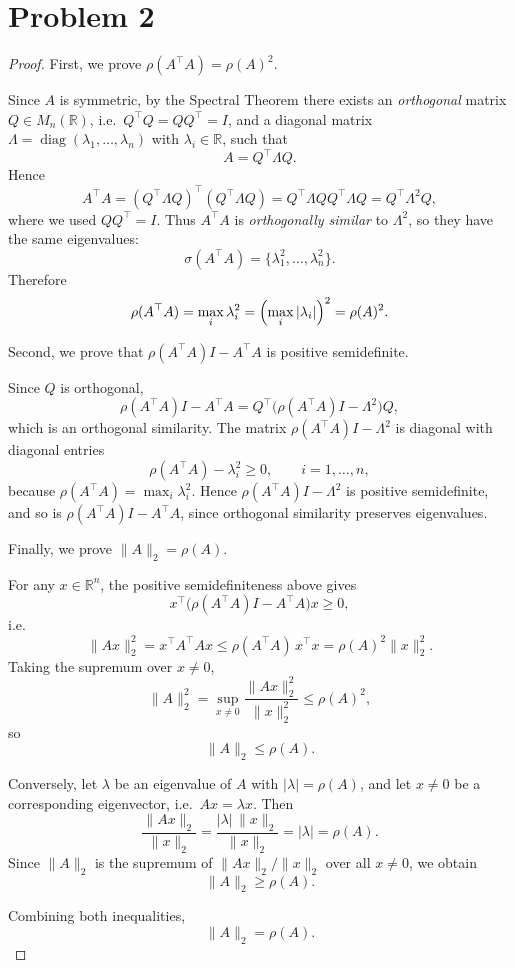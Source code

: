 \documentclass[11pt,a4paper]{report}
\theoremstyle{remark}
\begin{document}
\section*{Problem 2}
\begin{proof}
First, we prove \(\rho(A^\top A)=\rho(A)^2\).

Since \(A\) is symmetric, by the Spectral Theorem there exists an
\emph{orthogonal} matrix \(Q\in M_n(\mathbb{R})\), i.e.\ \(Q^\top Q=QQ^\top=I\),
and a diagonal matrix \(\Lambda=\operatorname{diag}(\lambda_1,\dots,\lambda_n)\)
with \(\lambda_i\in\mathbb{R}\), such that
\[
A=Q^\top \Lambda Q.
\]
Hence
\[
A^\top A
=(Q^\top \Lambda Q)^\top (Q^\top \Lambda Q)
=Q^\top \Lambda Q Q^\top \Lambda Q
=Q^\top \Lambda^2 Q,
\]
where we used \(QQ^\top=I\). Thus \(A^\top A\) is \emph{orthogonally similar}
to \(\Lambda^2\), so they have the same eigenvalues:
\[
\sigma(A^\top A)=\{\lambda_1^2,\dots,\lambda_n^2\}.
\]
Therefore
\[
\rho(A^\top A)
=\max_i \lambda_i^2
=\Bigl(\max_i |\lambda_i|\Bigr)^2
=\rho(A)^2.
\]

Second, we prove that \(\rho(A^\top A)I-A^\top A\) is positive semidefinite.

Since \(Q\) is orthogonal,
\[
\rho(A^\top A)I-A^\top A
=Q^\top\bigl(\rho(A^\top A)I-\Lambda^2\bigr)Q,
\]
which is an orthogonal similarity. The matrix
\(\rho(A^\top A)I-\Lambda^2\) is diagonal with diagonal entries
\[
\rho(A^\top A)-\lambda_i^2\ge 0,\qquad i=1,\dots,n,
\]
because \(\rho(A^\top A)=\max_i\lambda_i^2\). Hence
\(\rho(A^\top A)I-\Lambda^2\) is positive semidefinite, and so is
\(\rho(A^\top A)I-A^\top A\), since orthogonal similarity preserves eigenvalues.

Finally, we prove \(\|A\|_2=\rho(A)\).

For any \(x\in\mathbb{R}^n\), the positive semidefiniteness above gives
\[
x^\top\bigl(\rho(A^\top A)I-A^\top A\bigr)x\ge 0,
\]
i.e.
\[
\|Ax\|_2^2=x^\top A^\top A x\le \rho(A^\top A)\,x^\top x
=\rho(A)^2\|x\|_2^2.
\]
Taking the supremum over \(x\neq 0\),
\[
\|A\|_2^2
=\sup_{x\neq 0}\frac{\|Ax\|_2^2}{\|x\|_2^2}
\le \rho(A)^2,
\]
so
\[
\|A\|_2\le \rho(A).
\]

Conversely, let \(\lambda\) be an eigenvalue of \(A\) with
\(|\lambda|=\rho(A)\), and let \(x\neq 0\) be a corresponding eigenvector,
i.e.\ \(Ax=\lambda x\). Then
\[
\frac{\|Ax\|_2}{\|x\|_2}
=\frac{|\lambda|\,\|x\|_2}{\|x\|_2}
=|\lambda|
=\rho(A).
\]
Since \(\|A\|_2\) is the supremum of \(\|Ax\|_2/\|x\|_2\) over all \(x\neq 0\),
we obtain
\[
\|A\|_2\ge \rho(A).
\]

Combining both inequalities,
\[
\|A\|_2=\rho(A).
\]
\end{proof}
\end{document}
